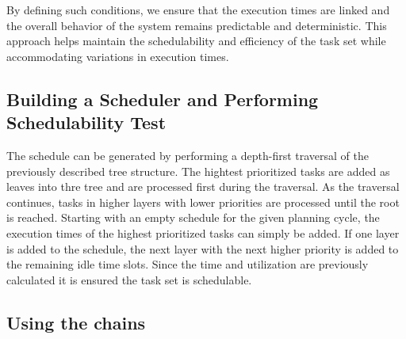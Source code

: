By defining such conditions, we ensure that the execution times are linked and the overall behavior of the system remains predictable and deterministic. 
This approach helps maintain the schedulability and efficiency of the task set while accommodating variations in execution times.

\subsection{Building a Scheduler and Performing Schedulability Test}\label{sec:concept_scheduler}
The schedule can be generated by performing a depth-first traversal of the previously described tree structure.
The hightest prioritized tasks are added as leaves into thre tree and are processed first during the traversal.
As the traversal continues, tasks in higher layers with lower priorities are processed until the root is reached.
Starting with an empty schedule for the given planning cycle, the execution times of the highest prioritized tasks can simply be added.
If one layer is added to the schedule, the next layer with the next higher priority is added to the remaining idle time slots.
Since the time and utilization are previously calculated it is ensured the task set is schedulable.

\subsection{Using the chains}\label{sec:chains}
\todo{!!}
